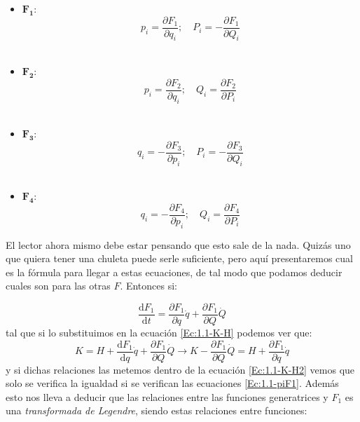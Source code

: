 \documentclass[12pt,a4paper]{article}
\numberwithin{equation}{section}
\numberwithin{figure}{section}
\newcommand{\parciales}[2]{\frac{\partial #1}{\partial #2}}
\newcommand{\D}{\mathrm{d}}
\begin{document}
\begin{itemize} 
\item $\mathbf{F_1}$:
\begin{equation}
p_i = \parciales{F_1}{q_i}; \quad P_i = - \parciales{F_1}{Q_i} \label{Ec:1.1-piF1}
\end{equation} \\

\item $\mathbf{F_2}$:
\begin{equation}
p_i = \parciales{F_2}{q_i}; \quad Q_i = \parciales{F_2}{P_i} \label{Ec:1.1-piF2}
\end{equation} \\

\item $\mathbf{F_3}$:
\begin{equation}
q_i = - \parciales{F_3}{p_i}; \quad P_i = - \parciales{F_3}{Q_i} \label{Ec:1.1-piF3}
\end{equation}\\

\item $\mathbf{F_4}$:
\begin{equation}
q_i = - \parciales{F_4}{p_i}; \quad Q_i =  \parciales{F_4}{P_i} \label{Ec:1.1-piF4}
\end{equation}
\end{itemize}

El lector ahora mismo debe estar pensando que esto sale de la nada. Quizás uno que quiera tener una chuleta puede serle suficiente, pero aquí presentaremos cual es la fórmula para llegar a estas ecuaciones, de tal modo que podamos deducir cuales son para las otras $F$. Entonces si:

\begin{equation}
\dfrac{\D F_1}{\D t} = \dfrac{\partial F_1}{\partial q} \dot{q} + \dfrac{\partial F_1}{\partial Q} \dot{Q} 
\end{equation}
tal que si lo substituimos en la ecuación \ref{Ec:1.1-K-H} podemos ver que:
\begin{equation}
K = H + \dfrac{\D F_1}{\D q} \dot{q} + \dfrac{\partial F_1}{\partial Q} \dot{Q}  \longrightarrow K - \dfrac{\partial F_1}{\partial Q} \dot{Q}  = H + \dfrac{\partial F_1}{\partial q} \dot{q} 
\end{equation}
y si dichas relaciones las metemos dentro de la ecuación \ref{Ec:1.1-K-H2} vemos que solo se verifica la igualdad si se verifican las ecuaciones \ref{Ec:1.1-piF1}. Además esto nos lleva a deducir que las relaciones entre las funciones generatrices y $F_1$ es una \textit{transformada de Legendre}, siendo estas relaciones entre funciones:
\end{document}

